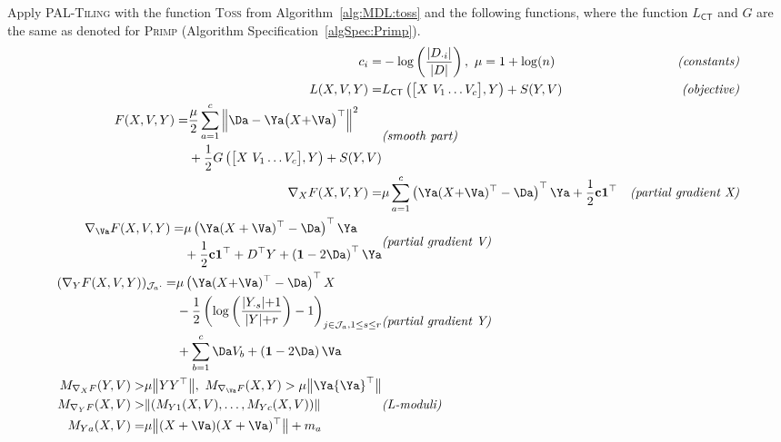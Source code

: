 \begin{algSpec}[C-Salt]\label{algSpec:CSalt} Apply \textsc{PAL-Tiling} with the function \textsc{Toss} from Algorithm~\ref{alg:MDL:toss} and the following functions, where the function $L_{\mathsf{CT}}$ and $G$ are the same as denoted for \textsc{Primp} (Algorithm Specification~\ref{algSpec:Primp}).
\begin{align*}
c_i =& -\log\left(\frac{\lvert D_{\cdot i}\rvert }{\lvert D\rvert }\right),\ \mu=1+\log(n) &\textit{(constants)}\\
L(X,V,Y)=& L_{\mathsf{CT}}\left(\bigl[X\ V_1\ldots V_c\bigr],Y\right)+S(Y,V)&\textit{(objective)}\\
\begin{split}
F(X,V,Y)=& \frac{\mu}{2}\sum_{a=1}^c\left\lVert \Da-\Ya\bigl(X{+}\Va\bigr)^\top \right\rVert ^2\\
&+\frac{1}{2} G\left(\bigl[X\ V_1\ldots V_c\bigr],Y\right)
+S(Y,V)
\end{split}&\textit{(smooth part)}\\
\nabla_XF(X,V,Y)=&\mu\sum_{a=1}^c\left(\Ya(X{+}\Va)^\top -\Da\right)^\top \Ya+\frac{1}{2}\mathbf{c}\mathbf{1}^\top & \textit{(partial gradient X)}\\
\begin{split}
\nabla_\Va F(X,V,Y)=&\mu\left(\Ya(X+\Va)^\top -\Da\right)^\top\Ya\\
&+\frac{1}{2}\mathbf{c1}^\top+D^\top Y +\left(\mathbf{1}-2\Da\right)^\top \Ya
\end{split}&\textit{(partial gradient V)}\\
\begin{split}
(\nabla_Y F(X,V,Y))_{\mathcal{J}_a\cdot}=&\mu \left(\Ya(X{+}\Va)^\top-\Da\right)^\top X\\
&-\frac{1}{2}\left(\log\left(\frac{\lvert Y_{\cdot s}\rvert {+}1}{\lvert Y\rvert {+}r}\right)-1\right)_{j\in\mathcal{J}_a,1\leq s\leq r}\\
 &+ \sum_{b=1}^c\Da V_b+\left(\mathbf{1}-2\Da\right)\Va
  \end{split}& \textit{(partial gradient Y)}\\
  \begin{split}
      M_{\nabla_X F}(Y,V)>&\mu\bigl\lVert YY^\top \bigr\rVert ,\ M_{\nabla_\Va F}(X,Y)>\mu\bigl\lVert \Ya{\Ya}^\top \bigr\rVert \\
      M_{\nabla_YF}(X,V)>&\lVert (M_{Y1}(X,V),\ldots, M_{Yc}(X,V))\rVert \\ M_{Ya} (X,V)=&\mu\bigl\lVert (X+\Va)(X+\Va)^\top \bigr\rVert +m_a
  \end{split} & \textit{(L-moduli)}
\end{align*}
\end{algSpec}
